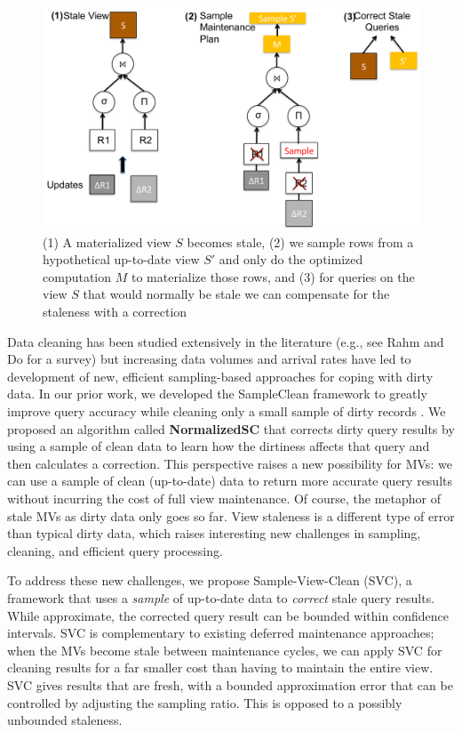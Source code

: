 \begin{figure}[t] \vspace{-2em}
\centering
 \includegraphics[scale=0.30]{figs/sys-arch.pdf} \vspace{-.25em}
 \caption{(1) A materialized view $S$ becomes stale, (2) we sample rows from a hypothetical up-to-date view $S'$ and only do the optimized computation $M$ to materialize those rows, and (3) for queries on the view $S$ that would normally be stale we can compensate for the staleness with a correction  \label{sys-arch}}\vspace{-1.75em}
\end{figure}

Data cleaning has been studied extensively in the literature (e.g., see Rahm and Do for a survey\cite{rahm2000data}) but increasing data volumes and arrival rates have led to development of new, efficient sampling-based approaches for coping with dirty data.   
In our prior work, we developed the SampleClean framework to greatly improve query accuracy while cleaning only a small sample of dirty records \cite{wang1999sample}.  
We proposed an algorithm called \textbf{NormalizedSC} that corrects dirty query results by using a sample of clean data to learn how the dirtiness affects that query and then calculates a correction.  
This perspective raises a new possibility for MVs: we can use a sample of clean (up-to-date) data to return more accurate query results without incurring the cost of full view maintenance.
Of course, the metaphor of stale MVs as dirty data only goes so far. 
View staleness is a different type of error than typical dirty data, which raises interesting new challenges in sampling, cleaning, and efficient query processing.

To address these new challenges, we propose Sample-View-Clean (SVC), a framework that uses a \emph{sample} of up-to-date data to \emph{correct} stale query results.  
While approximate, the corrected query result can be bounded within confidence intervals.
SVC is complementary to existing deferred maintenance approaches; when the MVs become stale between maintenance cycles, we can apply SVC for cleaning results for a far smaller cost than having to maintain the entire view.
SVC gives results that are fresh, with a bounded approximation error that can be controlled by adjusting the sampling ratio.
This is opposed to a possibly unbounded staleness.

